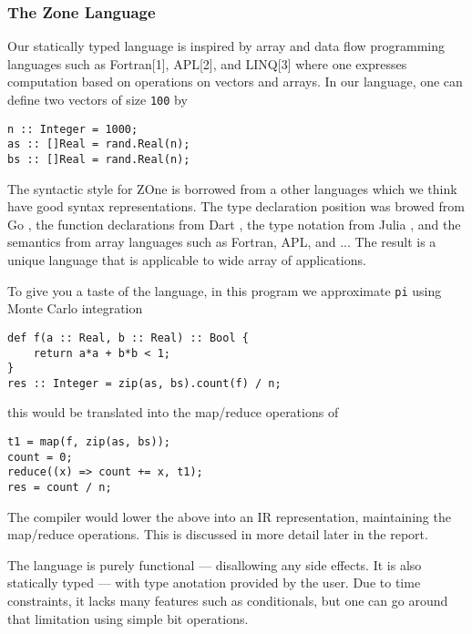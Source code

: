 \subsubsection{The Zone Language}
\label{sec:zonelang}

Our statically typed language is inspired by array and data flow
programming languages such as Fortran{[}1{]}, APL{[}2{]}, and
LINQ{[}3{]} where one expresses computation based on operations on
vectors and arrays. In our language, one can define two vectors of size
\texttt{100} by

\begin{verbatim}
n :: Integer = 1000;
as :: []Real = rand.Real(n);
bs :: []Real = rand.Real(n); 
\end{verbatim}


The syntactic style for ZOne is borrowed from a other languages
	which we think have good syntax representations.
The type declaration position was browed from Go ,
	the function declarations from Dart ,
	the type notation from Julia ,
	and the semantics from array languages such as Fortran, APL,
	and ...
The result is a unique language that is applicable to wide array
	of applications.



To give you a taste of the language, in this program we approximate
\texttt{pi} using Monte Carlo integration

\begin{verbatim}
def f(a :: Real, b :: Real) :: Bool {
	return a*a + b*b < 1;
}
res :: Integer = zip(as, bs).count(f) / n;
\end{verbatim}

this would be translated into the map/reduce operations of

\begin{verbatim}
t1 = map(f, zip(as, bs));
count = 0;
reduce((x) => count += x, t1);
res = count / n;
\end{verbatim}

The compiler would lower the above into an IR representation,
maintaining the map/reduce operations. This is discussed 
in more detail later in the report.


The language is purely functional --- disallowing any side effects.
It is also statically typed --- with type anotation provided by the user.
Due to time constraints, it lacks many features such as conditionals, but 
	one can go around that limitation using simple bit operations.


